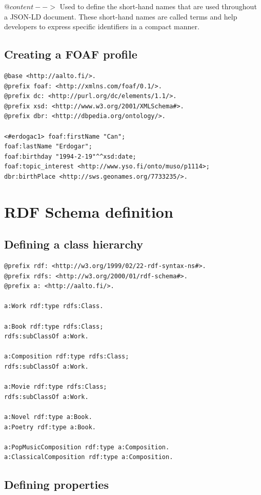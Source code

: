 \documentclass{article}
\begin{document}
$@content -->$ Used to define the short-hand names that are used throughout a JSON-LD document. These short-hand names are called terms and help developers to express specific identifiers in a compact manner.\\

\subsection{Creating a FOAF profile}

\begin{verbatim}
@base <http://aalto.fi/>.
@prefix foaf: <http://xmlns.com/foaf/0.1/>.
@prefix dc: <http://purl.org/dc/elements/1.1/>.
@prefix xsd: <http://www.w3.org/2001/XMLSchema#>.
@prefix dbr: <http://dbpedia.org/ontology/>.

<#erdogac1> foaf:firstName "Can";
foaf:lastName "Erdogar";
foaf:birthday "1994-2-19"^^xsd:date;
foaf:topic_interest <http://www.yso.fi/onto/muso/p1114>;
dbr:birthPlace <http://sws.geonames.org/7733235/>.
\end{verbatim}

\section{RDF Schema definition}

\subsection{Defining a class hierarchy}

\begin{verbatim}
@prefix rdf: <http://w3.org/1999/02/22-rdf-syntax-ns#>.
@prefix rdfs: <http://w3.org/2000/01/rdf-schema#>.
@prefix a: <http://aalto.fi/>.

a:Work rdf:type rdfs:Class.

a:Book rdf:type rdfs:Class;
rdfs:subClassOf a:Work.

a:Composition rdf:type rdfs:Class;
rdfs:subClassOf a:Work.

a:Movie rdf:type rdfs:Class;
rdfs:subClassOf a:Work.

a:Novel rdf:type a:Book.
a:Poetry rdf:type a:Book.

a:PopMusicComposition rdf:type a:Composition.
a:ClassicalComposition rdf:type a:Composition.
\end{verbatim}

\subsection{Defining properties}
\end{document}
